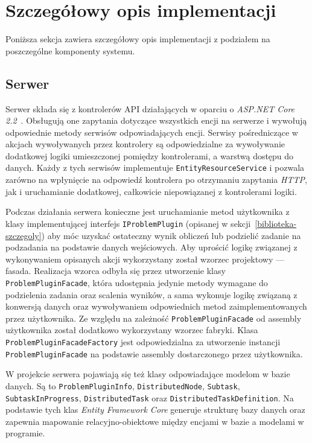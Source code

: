 \documentclass[a4paper,11pt,twoside]{report}
\theoremstyle{definition}
\begin{document}
\section{Szczegółowy opis implementacji}

Poniższa sekcja zawiera szczegółowy opis implementacji z podziałem na poszczególne komponenty systemu.


\subsection{Serwer}

Serwer składa się z kontrolerów API działających w oparciu o \textit{ASP.NET Core 2.2}~\cite{aspnet-core}. Obsługują one zapytania dotyczące wszystkich encji na serwerze i wywołują odpowiednie metody serwisów odpowiadających encji. Serwisy pośredniczące w akcjach wywoływanych przez kontrolery są odpowiedzialne za wywoływanie dodatkowej logiki umieszczonej pomiędzy kontrolerami, a warstwą dostępu do danych. Każdy z tych serwisów implementuje \texttt{EntityResourceService} i pozwala zarówno na wpłynięcie na odpowiedź kontrolera po otrzymaniu zapytania \textit{HTTP}, jak i uruchamianie dodatkowej, całkowicie niepowiązanej z kontrolerami logiki.

Podczas działania serwera konieczne jest uruchamianie metod użytkownika z klasy implementującej interfejs \texttt{IProblemPlugin} (opisanej w sekcji~\ref{biblioteka-szczegoly}) aby móc uzyskać ostateczny wynik obliczeń lub podzielić zadanie na podzadania na podstawie danych wejściowych.
Aby uprościć logikę związanej z wykonywaniem opisanych akcji wykorzystany został wzorzec projektowy --- fasada.
Realizacja wzorca odbyła się przez utworzenie klasy \texttt{ProblemPluginFacade}, która udostępnia jedynie metody wymagane do podzielenia zadania oraz scalenia wyników, a sama wykonuje logikę związaną z konwersją danych oraz wywoływaniem odpowiednich metod zaimplementowanych przez użytkownika.
Ze względu na zależność \texttt{ProblemPluginFacade} od assembly użytkownika został dodatkowo wykorzystany wzorzec fabryki. Klasa \texttt{ProblemPluginFacadeFactory} jest odpowiedzialna za utworzenie instancji \texttt{ProblemPluginFacade} na podstawie assembly dostarczonego przez użytkownika.

W projekcie serwera pojawiają się też klasy odpowiadające modelom w bazie danych.
Są to \texttt{ProblemPluginInfo}, \texttt{DistributedNode}, \texttt{Subtask}, \texttt{SubtaskInProgress}, \texttt{DistributedTask} oraz \texttt{DistributedTaskDefinition}.
Na podstawie tych klas \textit{Entity Framework Core} generuje strukturę bazy danych oraz zapewnia mapowanie relacyjno-obiektowe między encjami w bazie a modelami w programie.
\end{document}
